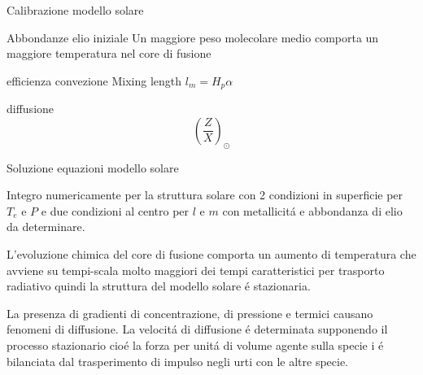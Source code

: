 \documentclass[10pt,xcolor={usenames},fleqn,mathserif,serif]{beamer}
\begin{document}
\begin{frame}{Calibrazione modello solare}

\begin{block}{Abbondanze elio iniziale}
Un maggiore peso molecolare medio comporta un maggiore temperatura nel core di fusione
\end{block}

\begin{block}{efficienza convezione}
Mixing length $l_m=H_p\alpha$
\end{block}

\begin{block}{diffusione}
\[\left(\frac{Z}{X}\right)_{\odot}\]
\end{block}

\end{frame}

\begin{wordonframe}{Soluzione equazioni modello solare}

Integro numericamente per la struttura solare con 2 condizioni in superficie per $T_e$ e $P$ e due condizioni al centro per $l$ e $m$ con metallicit\'a e abbondanza di elio da determinare.

L'evoluzione chimica del core di fusione comporta un aumento di temperatura che avviene su tempi-scala molto maggiori dei tempi caratteristici per trasporto radiativo quindi la struttura del modello solare \'e stazionaria.

La presenza di gradienti di concentrazione, di pressione e termici causano fenomeni di diffusione. La velocit\'a di diffusione \'e determinata supponendo il processo stazionario cio\'e la forza per unit\'a di volume agente sulla specie i \'e bilanciata dal trasperimento di impulso negli urti con le altre specie.

\end{wordonframe}
\end{document}
